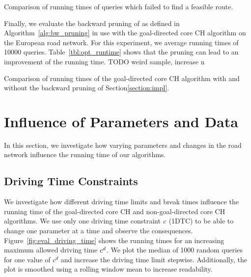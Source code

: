 \begin{table}[hbtp]
	\centering
	
	\caption{Comparison of running times of queries which failed to find a feasible route.}
	\label{tbl:times_no_path}
\end{table}

Finally, we evaluate the backward pruning of as defined in Algorithm~\ref{alg:bw_pruning} in use with the goal-directed core CH algorithm on the European road network. For this experiment, we average running times of \num{10000} queries. Table~\ref{tbl:opt_runtime} shows that the pruning can lead to an improvement of the running time. TODO weird sample, increase n

\begin{table}[hbtp]
	\centering
	
	\caption{Comparison of running times of the goal-directed core CH algorithm with and without the backward pruning of Section\ref{section:impl}.}
	\label{tbl:opt_runtime}
\end{table}

\section{Influence of Parameters and Data}
In this section, we investigate how varying parameters and changes in the road network influence the running time of our algorithms.

\subsection{Driving Time Constraints}
We investigate how different driving time limits and break times influence the running time of the goal-directed core CH and non-goal-directed core CH algorithms. We use only one driving time constraint $c$ (1DTC) to be able to change one parameter at a time and observe the consequences. Figure~\ref{fig:eval_driving_time} shows the running times for an increasing maximum allowed driving time $c^d$. We plot the median of 1000 random queries for one value of $c^d$ and increase the driving time limit stepwise. Additionally, the plot is smoothed using a rolling window mean to increase readability.


